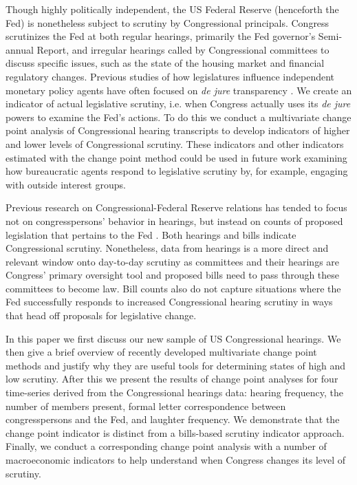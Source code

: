 \documentclass[a4paper]{article}\usepackage[]{graphicx}\usepackage[]{color}
\begin{document}
Though highly politically independent, the US Federal Reserve (henceforth the Fed) is nonetheless subject to scrutiny by Congressional principals. Congress scrutinizes the Fed at both regular hearings, primarily the Fed governor's Semi-annual Report, and irregular hearings called by Congressional committees to discuss specific issues, such as the state of the housing market and financial regulatory changes. Previous studies of how legislatures influence independent monetary policy agents have often focused on \emph{de jure} transparency \citep[for example][]{Stasavage2003}. We create an indicator of actual legislative scrutiny, i.e. when Congress actually uses its \emph{de jure} powers to examine the Fed's actions. To do this we conduct a multivariate change point analysis \citep{Matteson2014} of Congressional hearing transcripts to develop indicators of higher and lower levels of Congressional scrutiny. These indicators and other indicators estimated with the change point method could be used in future work examining how bureaucratic agents respond to legislative scrutiny by, for example, engaging with outside interest groups.

Previous research on Congressional-Federal Reserve relations has tended to focus not on congresspersons' behavior in hearings, but instead on counts of proposed legislation that pertains to the Fed \citep[e.g.][]{Kettl1988,Binder2014}. Both hearings and bills indicate Congressional scrutiny. Nonetheless, data from hearings is a more direct and relevant window onto day-to-day scrutiny as committees and their hearings are Congress' primary oversight tool \citep[][382]{oleszek2013} and proposed bills need to pass through these committees to become law. Bill counts also do not capture situations where the Fed successfully responds to increased Congressional hearing scrutiny in ways that head off proposals for legislative change.

In this paper we first discuss our new sample of US Congressional hearings. We then give a brief overview of recently developed multivariate change point methods and justify why they are useful tools for determining states of high and low scrutiny. After this we present the results of change point analyses for four time-series derived from the Congressional hearings data: hearing frequency, the number of members present, formal letter correspondence between congresspersons and the Fed, and laughter frequency. We demonstrate that the change point indicator is distinct from a bills-based scrutiny indicator approach. Finally, we conduct a corresponding change point analysis with a number of macroeconomic indicators to help understand when Congress changes its level of scrutiny.
\end{document}

